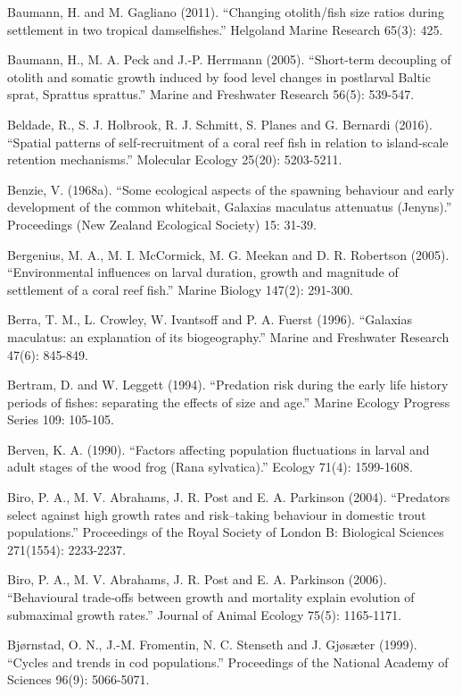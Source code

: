 \documentclass[]{book}
\begin{document}
Baumann, H. and M. Gagliano (2011). ``Changing otolith/fish size ratios
during settlement in two tropical damselfishes.'' Helgoland Marine
Research 65(3): 425.

Baumann, H., M. A. Peck and J.-P. Herrmann (2005). ``Short-term
decoupling of otolith and somatic growth induced by food level changes
in postlarval Baltic sprat, Sprattus sprattus.'' Marine and Freshwater
Research 56(5): 539-547.

Beldade, R., S. J. Holbrook, R. J. Schmitt, S. Planes and G. Bernardi
(2016). ``Spatial patterns of self‐recruitment of a coral reef fish in
relation to island‐scale retention mechanisms.'' Molecular Ecology
25(20): 5203-5211.

Benzie, V. (1968a). ``Some ecological aspects of the spawning behaviour
and early development of the common whitebait, Galaxias maculatus
attenuatus (Jenyns).'' Proceedings (New Zealand Ecological Society) 15:
31-39.

Bergenius, M. A., M. I. McCormick, M. G. Meekan and D. R. Robertson
(2005). ``Environmental influences on larval duration, growth and
magnitude of settlement of a coral reef fish.'' Marine Biology 147(2):
291-300.

Berra, T. M., L. Crowley, W. Ivantsoff and P. A. Fuerst (1996).
``Galaxias maculatus: an explanation of its biogeography.'' Marine and
Freshwater Research 47(6): 845-849.

Bertram, D. and W. Leggett (1994). ``Predation risk during the early
life history periods of fishes: separating the effects of size and
age.'' Marine Ecology Progress Series 109: 105-105.

Berven, K. A. (1990). ``Factors affecting population fluctuations in
larval and adult stages of the wood frog (Rana sylvatica).'' Ecology
71(4): 1599-1608.

Biro, P. A., M. V. Abrahams, J. R. Post and E. A. Parkinson (2004).
``Predators select against high growth rates and risk--taking behaviour
in domestic trout populations.'' Proceedings of the Royal Society of
London B: Biological Sciences 271(1554): 2233-2237.

Biro, P. A., M. V. Abrahams, J. R. Post and E. A. Parkinson (2006).
``Behavioural trade‐offs between growth and mortality explain evolution
of submaximal growth rates.'' Journal of Animal Ecology 75(5):
1165-1171.

Bjørnstad, O. N., J.-M. Fromentin, N. C. Stenseth and J. Gjøsæter
(1999). ``Cycles and trends in cod populations.'' Proceedings of the
National Academy of Sciences 96(9): 5066-5071.
\end{document}
